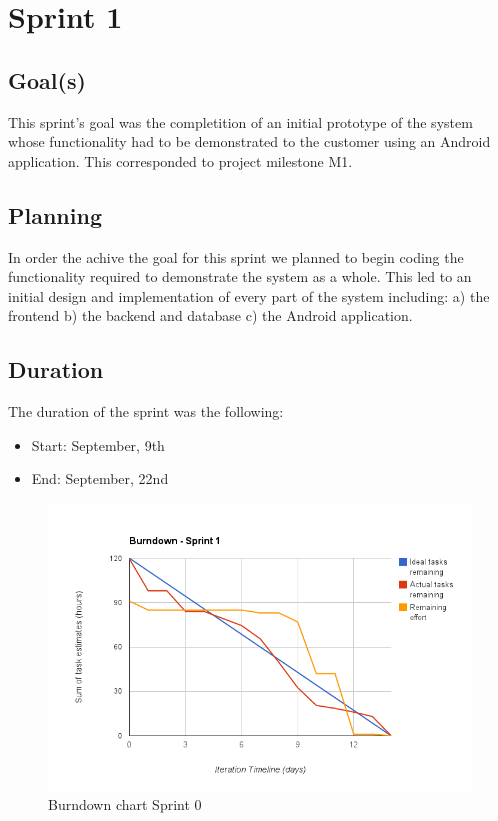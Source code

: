 

\chapter{Sprint 1}
\label{Sprint0}

\section{Goal(s)}
This sprint's goal was the completition of an initial prototype of the system whose functionality
had to be demonstrated to the customer using an Android application. This corresponded to project milestone M1.

\section{Planning}
In order the achive the goal for this sprint we planned to begin coding the functionality required to demonstrate
the system as a whole. This led to an initial design and implementation of every part of the system including:
a) the frontend b) the backend and database c) the Android application.

\section{Duration}
The duration of the sprint was the following:
\begin{itemize}
\item Start: September, 9th
\item End: September, 22nd
\end{itemize}

\begin{figure}[H]
\centering
\includegraphics[scale=0.60]{../Figures/burndownSprint1.png}
\caption{Burndown chart Sprint 0}
\label{figure:burndownsprint0}
\end{figure}

